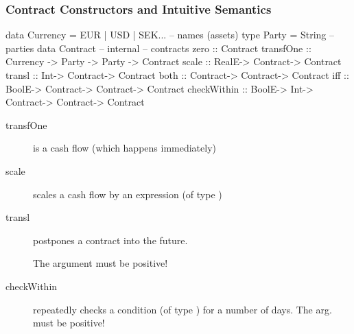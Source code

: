 \documentclass[xcolor=dvipsnames,11pt]{beamer}
\renewcommand{\emph}[1]{\textcolor{structure!90}{#1}}
\begin{document}
\begin{frame}[fragile,t]
    \frametitle{Contract Constructors and Intuitive Semantics}

\begin{hscode}
  data Currency = EUR | USD | SEK... -- names (assets)
  type Party = String       -- parties
  data Contract -- internal -- contracts
  zero        :: Contract            
  transfOne   :: Currency -> Party -> Party -> Contract
  scale       :: RealE-> Contract-> Contract
  transl      :: Int-> Contract-> Contract
  both        :: Contract-> Contract-> Contract
  iff         :: BoolE-> Contract-> Contract-> Contract
  checkWithin :: BoolE-> Int-> Contract-> Contract-> Contract
\end{hscode}

\begin{description}
\item[transfOne] is a cash flow (which happens immediately)
\item[scale] scales a cash flow by an expression (of type )
\item[transl] postpones a contract into the \emph{future}.

    The  argument must be positive!

\item[checkWithin] repeatedly checks a condition (of type ) for a number of days.
    The  arg. must be positive!
\end{description}
\end{frame}
\end{document}
